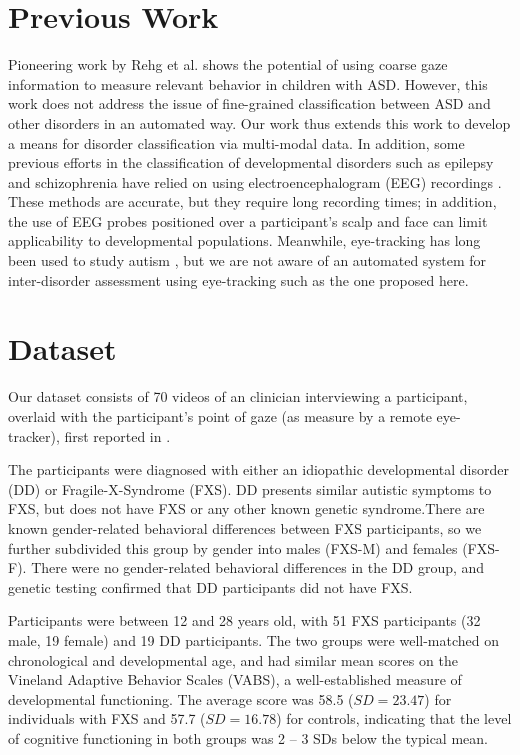 \documentclass{llncs}
\begin{document}
  \section {Previous Work}
  \vspace{-1em}

  Pioneering work by Rehg et al. \cite{RAG33} shows the potential of using coarse gaze information to measure relevant behavior in children with ASD.
  However, this work does not address the issue of fine-grained classification between ASD and other disorders in an automated way. Our work thus extends this work to develop a means for disorder classification via multi-modal data.
   In addition, some previous efforts in the classification of developmental disorders such as epilepsy and schizophrenia have relied on using electroencephalogram (EEG) recordings \cite{Kumar}. These methods are accurate, but they require long recording times; in addition, the use of EEG probes positioned over a participant's scalp and face can limit applicability to developmental populations. Meanwhile, eye-tracking has long been used to study autism \cite{Boraston,hashemi}, but we are not aware of an automated system for inter-disorder assessment using eye-tracking such as the one proposed here.

  \vspace{-1.5em}
  \section{Dataset}
  \vspace{-1.5em}
 Our dataset consists of 70 videos of an clinician interviewing a participant, overlaid with the participant's point of gaze (as measure by a remote eye-tracker), first reported in \cite{hall2015quantifying}.

 The participants were diagnosed with either an idiopathic developmental disorder (DD) or Fragile-X-Syndrome (FXS). DD
presents similar autistic symptoms to FXS, but does not have FXS or any other known genetic syndrome.There are known gender-related behavioral differences between FXS participants, so we further subdivided this group by gender into males (FXS-M) and females (FXS-F). There were no gender-related behavioral differences in the DD group, and genetic testing confirmed that DD participants did not have FXS.

  Participants were between 12 and 28 years old, with 51 FXS participants (32 male, 19 female) and 19 DD participants. The two groups were well-matched on chronological and developmental age, and had similar mean scores on the Vineland Adaptive Behavior Scales (VABS), a well-established measure of developmental functioning. The average score was 58.5 ($SD = 23.47$) for individuals with FXS and 57.7 ($SD= 16.78$) for controls, indicating that the level of cognitive functioning in both groups was 2 -- 3 SDs below the typical mean.
  
\end{document}
